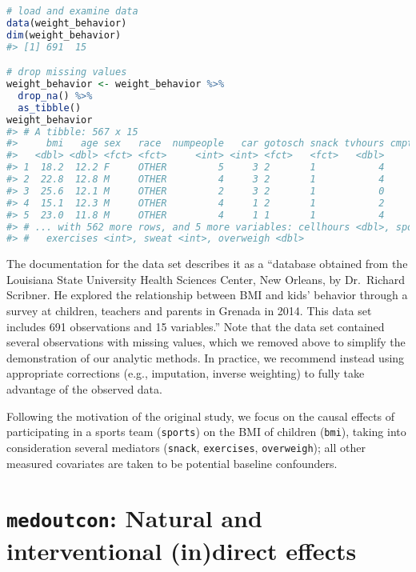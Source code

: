 \documentclass[
  12pt,
]{book}
\newcommand{\passthrough}[1]{#1}
\theoremstyle{definition}
\theoremstyle{definition}
\theoremstyle{definition}
\newcommand{\1}{\mathbbm{1}}
\begin{document}
\begin{lstlisting}[language=R]
# load and examine data
data(weight_behavior)
dim(weight_behavior)
#> [1] 691  15

# drop missing values
weight_behavior <- weight_behavior %>%
  drop_na() %>%
  as_tibble()
weight_behavior
#> # A tibble: 567 x 15
#>     bmi   age sex   race  numpeople   car gotosch snack tvhours cmpthours
#>   <dbl> <dbl> <fct> <fct>     <int> <int> <fct>   <fct>   <dbl>     <dbl>
#> 1  18.2  12.2 F     OTHER         5     3 2       1           4         0
#> 2  22.8  12.8 M     OTHER         4     3 2       1           4         2
#> 3  25.6  12.1 M     OTHER         2     3 2       1           0         2
#> 4  15.1  12.3 M     OTHER         4     1 2       1           2         1
#> 5  23.0  11.8 M     OTHER         4     1 1       1           4         3
#> # ... with 562 more rows, and 5 more variables: cellhours <dbl>, sports <fct>,
#> #   exercises <int>, sweat <int>, overweigh <dbl>
\end{lstlisting}

The documentation for the data set describes it as a ``database obtained from the
Louisiana State University Health Sciences Center, New Orleans, by Dr.~Richard
Scribner. He explored the relationship between BMI and kids' behavior through a
survey at children, teachers and parents in Grenada in 2014. This data set
includes 691 observations and 15 variables.'' Note that the data set contained
several observations with missing values, which we removed above to simplify the
demonstration of our analytic methods. In practice, we recommend instead using
appropriate corrections (e.g., imputation, inverse weighting) to fully take
advantage of the observed data.

Following the motivation of the original study, we focus on the causal effects
of participating in a sports team (\passthrough{\lstinline!sports!}) on the BMI of children (\passthrough{\lstinline!bmi!}),
taking into consideration several mediators (\passthrough{\lstinline!snack!}, \passthrough{\lstinline!exercises!}, \passthrough{\lstinline!overweigh!});
all other measured covariates are taken to be potential baseline confounders.

\hypertarget{medoutcon-natural-and-interventional-indirect-effects}{%
\section{\texorpdfstring{\texttt{medoutcon}: Natural and interventional (in)direct effects}{medoutcon: Natural and interventional (in)direct effects}}\label{medoutcon-natural-and-interventional-indirect-effects}}
\end{document}
